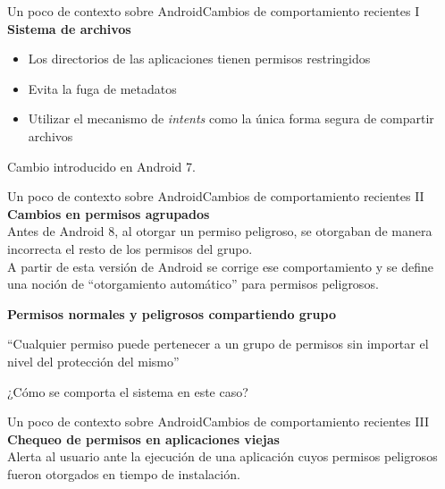 \documentclass[pdf, handout]{beamer} %
\begin{document}
\begin{frame}{Un poco de contexto sobre Android}{Cambios de comportamiento recientes I}
    \textbf{Sistema de archivos}\\
    \vspace{10px}
    \begin{itemize}
        \item Los directorios de las aplicaciones tienen permisos restringidos
        \item Evita la fuga de metadatos
        \item Utilizar el mecanismo de \textit{intents} como la única forma segura de compartir
              archivos
    \end{itemize}
    \vspace{10px}
    \pause
    Cambio introducido en Android 7.
\end{frame}

\begin{frame}{Un poco de contexto sobre Android}{Cambios de comportamiento recientes II}
    \textbf{Cambios en permisos agrupados} \\
    \vspace{10px}
    Antes de Android 8, al otorgar un permiso peligroso, se otorgaban de manera incorrecta el resto
    de los permisos del grupo.\\
    \vspace{5px}
    A partir de esta versión de Android se corrige ese comportamiento y se define una noción de
    ``otorgamiento automático'' para permisos peligrosos.

    \vspace{10px} \pause
    \textbf{Permisos normales y peligrosos compartiendo grupo} \\
    \begin{block}{}
        ``Cualquier permiso puede pertenecer a un grupo de permisos sin importar el nivel del
        protección del mismo''
    \end{block}
    \pause
    ¿Cómo se comporta el sistema en este caso?
\end{frame}

\begin{frame}{Un poco de contexto sobre Android}{Cambios de comportamiento recientes III}
    \textbf{Chequeo de permisos en aplicaciones viejas} \\
    \vspace{10px}
    Alerta al usuario ante la ejecución de una aplicación cuyos permisos peligrosos fueron otorgados
    en tiempo de instalación.
\end{frame}
\end{document}
